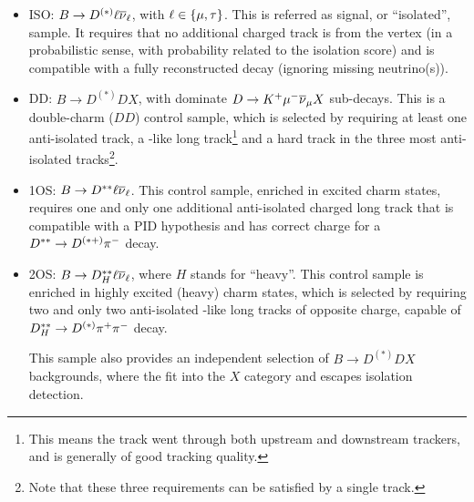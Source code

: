 \begin{itemize}
    \item ISO: $B \rightarrow D^{(*)} {\ell} {{\overline{\nu}}_\ell}$, with ${\ell} \in \{{\mu},
        {\tau}\}$.
        This is referred as signal, or ``isolated'', sample.
        It requires that no additional charged track is from the \B vertex
        (in a probabilistic sense, with probability related to the isolation
        score)
        and is compatible with a fully reconstructed \B decay
        (ignoring missing neutrino(s)).

    \item DD: $B \rightarrow D^{(*)}D X$,
        with dominate $D \rightarrow {\ensuremath{{K}^+}} {\ensuremath{\mu^-}} {\ensuremath{{\overline{\nu}}_\mu}} X$ sub-decays.
        This is a double-charm ($DD$) control sample,
        which is selected by requiring at least one anti-isolated track,
        a \kaon-like long track\footnote{
            This means the track went through both upstream and downstream
            trackers, and is generally of good tracking quality.
        } and a hard track in the three most anti-isolated tracks\footnote{
            Note that these three requirements can be satisfied by a single
            track.
        }.

    \item 1OS: $B \rightarrow D^{**} {\ell} {{\overline{\nu}}_\ell}$.
        This control sample, enriched in excited charm states,
        requires one and only one additional anti-isolated charged long track
        that is compatible with a \pion PID hypothesis and has correct charge
        for a $D^{**} \rightarrow D^{(*+)}{{\pi}^-}$ decay.

    \item 2OS: $B \rightarrow D^{**}_H {\ell} {{\overline{\nu}}_\ell}$,
        where $H$ stands for ``heavy''.
        This control sample is enriched in highly excited (heavy) charm states,
        which is selected by requiring two and only two anti-isolated \pion-like
        long tracks of opposite charge,
        capable of $D^{**}_H \rightarrow D^{(*)} {{\pi}^+}{{\pi}^-}$ decay.

        This sample also provides an independent selection of
        $B \rightarrow D^{(*)}D X$ backgrounds, where the \pip\pim fit into the
        $X$ category and \kaon escapes isolation detection.
\end{itemize}

